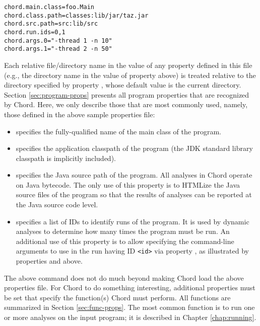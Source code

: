 \begin{framed}
\begin{verbatim}
chord.main.class=foo.Main
chord.class.path=classes:lib/jar/taz.jar
chord.src.path=src:lib/src
chord.run.ids=0,1
chord.args.0="-thread 1 -n 10"
chord.args.1="-thread 2 -n 50"
\end{verbatim}
\end{framed}

Each relative file/directory name in the value of any property
defined in this file (e.g., the  directory name in the value of
property  above) is treated relative to the directory
specified by property , whose default value
is the current directory.
Section \ref{sec:program-props} presents all program properties that are
recognized by Chord.  Here, we only describe those that are most commonly
used, namely, those defined in the above sample properties file:

\begin{itemize}
\item
{} specifies the fully-qualified name of the main
class of the program.
\item
{} specifies the application classpath
of the program (the JDK standard library classpath is implicitly
included).
\item
{} specifies the Java source path of the program.
All analyses in Chord operate on Java bytecode.  The only use
of this property is to HTMLize the Java source files of the program so
that the results of analyses can be reported at the Java
source code level.
\item
{} specifies a list of IDs to identify runs of the
program.  It is used by dynamic analyses to determine how many
times the program must be run.  An additional use of this property is
to allow specifying the command-line arguments to use in the run
having ID {\tt <id>} via property , as
illustrated by properties  and 
above.
\end{itemize}

The above command does not do much beyond making Chord load the above
properties file.  For Chord to do something interesting,
additional properties must be set that specify the function(s)
Chord must perform.  All functions are summarized in Section \ref{sec:func-props}.
The most common function is to run one or more analyses on the input program;
it is described in Chapter \ref{chap:running}.

